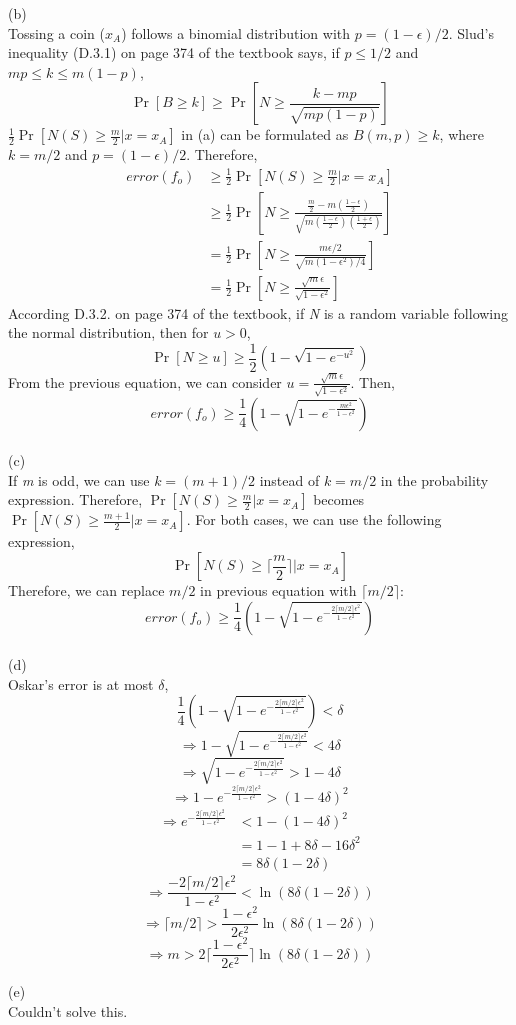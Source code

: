 \documentclass[letterpaper,11pt,notitlepage]{article}
\begin{document}
\noindent (b)\\
Tossing a coin ($x_A$) follows a binomial distribution with $p = (1-\epsilon)/2$. Slud's inequality (D.3.1) on page 374 of the textbook says, if $p \le 1/2$ and $mp \le k \le m(1-p)$,
\[\Pr[B\ge k] \ge \Pr[N\ge \frac{k-mp}{\sqrt{mp(1-p)}}]\]
$\frac{1}{2}\Pr[N(S)\ge\frac{m}{2}|x=x_A]$ in (a) can be formulated as $B(m,p) \ge k$, where $k = m/2$ and $p = (1-\epsilon)/2$. Therefore, 
\begin{align*} 
error(f_o) &\ge \frac{1}{2}\Pr[N(S)\ge\frac{m}{2}|x=x_A]\\ 
&\ge \frac{1}{2}\Pr[N \ge \frac{\frac{m}{2}-m(\frac{1-\epsilon}{2})}{\sqrt{m(\frac{1-\epsilon}{2})(\frac{1+\epsilon}{2})}}]\\
&= \frac{1}{2}\Pr[N \ge \frac{m\epsilon/2}{\sqrt{m(1-\epsilon^2)/4}}]\\
&= \frac{1}{2}\Pr[N \ge \frac{\sqrt{m}\epsilon}{\sqrt{1-\epsilon^2}}]
\end{align*} 
According D.3.2. on page 374 of the textbook, if \textit{N} is a random variable following the normal distribution, then for $u > 0$,
\[\Pr[N \ge u] \ge \frac{1}{2}(1-\sqrt{1-e^{-u^2}})\]
From the previous equation, we can consider $u = \frac{\sqrt{m}\epsilon}{\sqrt{1-\epsilon^2}}$. Then, 
\[error(f_o) \ge \frac{1}{4}(1-\sqrt{1-e^{-\frac{m\epsilon^2}{1-\epsilon^2}}})\]\\

\noindent (c)\\
If \textit{m} is odd, we can use $k = (m+1)/2$ instead of $k=m/2$ in the probability expression. Therefore, $\Pr[N(S)\ge \frac{m}{2}|x=x_A]$ becomes $\Pr[N(S)\ge \frac{m+1}{2}|x=x_A]$. For both cases, we can use the following expression,
\[\Pr[N(S)\ge \lceil\frac{m}{2}\rceil|x=x_A]\]
Therefore, we can replace $m/2$ in previous equation with $\lceil m/2 \rceil$:
\[error(f_o) \ge \frac{1}{4}(1-\sqrt{1-e^{-\frac{2\lceil m/2 \rceil \epsilon^2}{1-\epsilon^2}}})\]\\

\noindent (d)\\
Oskar's error is at most $\delta$,
\[\frac{1}{4}(1-\sqrt{1-e^{-\frac{2\lceil m/2 \rceil \epsilon^2}{1-\epsilon^2}}}) < \delta\]
\[\Longrightarrow 1-\sqrt{1-e^{-\frac{2\lceil m/2 \rceil \epsilon^2}{1-\epsilon^2}}} < 4\delta\]
\[\Longrightarrow \sqrt{1-e^{-\frac{2\lceil m/2 \rceil \epsilon^2}{1-\epsilon^2}}} > 1-4\delta\]
\[\Longrightarrow 1-e^{-\frac{2\lceil m/2 \rceil \epsilon^2}{1-\epsilon^2}} > (1-4\delta)^2\]
\begin{align*} 
\Longrightarrow e^{-\frac{2\lceil m/2 \rceil \epsilon^2}{1-\epsilon^2}} &< 1-(1-4\delta)^2\\
&=1-1+8\delta-16\delta^2\\
&=8\delta(1-2\delta)
\end{align*} 
\[\Longrightarrow \frac{-2\lceil m/2 \rceil \epsilon^2}{1-\epsilon^2}<\ln(8\delta(1-2\delta))\]
\[\Longrightarrow \lceil m/2 \rceil > \frac{1-\epsilon^2}{2\epsilon^2}\ln(8\delta(1-2\delta))\]
\[\Longrightarrow m > 2\lceil \frac{1-\epsilon^2}{2\epsilon^2} \rceil \ln(8\delta(1-2\delta))\]

\noindent (e)\\
Couldn't solve this. 
\end{document}
